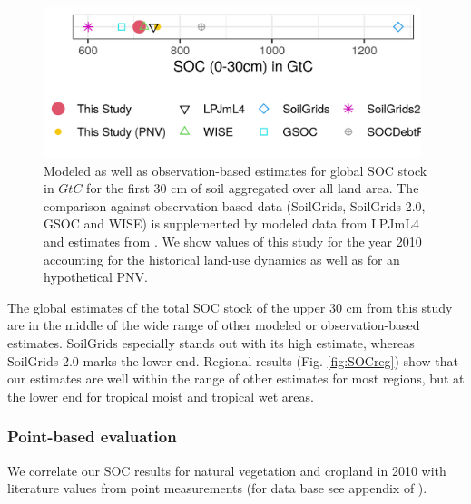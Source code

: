 \documentclass[gc, manuscript]{copernicus}
\begin{document}
\begin{figure}[h]
\includegraphics[width=11cm]{../ResultNotebooks/Output/Images/glo_comparisonfigure} \caption{Modeled as well as observation-based estimates for global SOC stock in $\unit{GtC}$ for the first 30 cm of soil aggregated over all land area. The comparison against observation-based data (SoilGrids, SoilGrids 2.0, GSOC and WISE) is supplemented by modeled data from LPJmL4 \citep{schaphoff_lpjml4_2018-1} and estimates from \citep{sanderman_soil_2017}. We show values of this study for the year 2010 accounting for the historical land-use dynamics as well as for an hypothetical PNV.}\label{fig:SOCglo}
\end{figure}

The global estimates of the total SOC stock of the upper 30 cm from this study are in the middle of the wide range of other modeled or observation-based estimates. SoilGrids \citep{hengl_soilgrids250m_2017} especially stands out with its high estimate, whereas SoilGrids 2.0 \citep{poggio_soilgrids_2021} marks the lower end. Regional results (Fig. \ref{fig:SOCreg}) show that our estimates are well within the range of other estimates for most regions, but at the lower end for tropical moist and tropical wet areas.

\hypertarget{point-based-evaluation}{%
\subsubsection{Point-based evaluation}\label{point-based-evaluation}}

We correlate our SOC results for natural vegetation and cropland in 2010 with literature values from point measurements (for data base see appendix of \citep{sanderman_soil_2017}).
\end{document}
